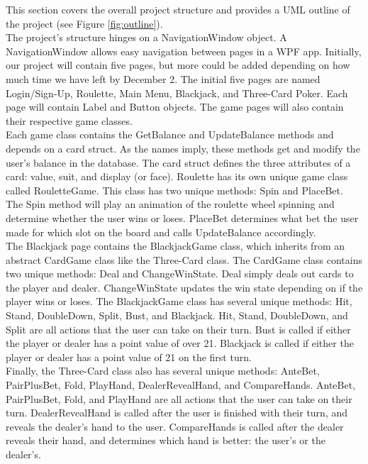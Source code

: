 \documentclass[10pt,conference,onecolumn,compsoc]{IEEEtran}
\begin{document}
\noindent
This section covers the overall project structure and provides a UML outline of the project (see Figure \ref{fig:outline}).\\
\newline
The project's structure hinges on a NavigationWindow object. A NavigationWindow allows easy navigation between pages in a WPF app. Initially, our project will contain five pages, but more could be added depending on how much time we have left by December 2. The initial five pages are named Login/Sign-Up, Roulette, Main Menu, Blackjack, and Three-Card Poker. Each page will contain Label and Button objects. The game pages will also contain their respective game classes.\\
\newline
Each game class contains the GetBalance and UpdateBalance methods and depends on a card struct. As the names imply, these methods get and modify the user's balance in the database. The card struct defines the three attributes of a card: value, suit, and display (or face). Roulette has its own unique game class called RouletteGame. This class has two unique methods: Spin and PlaceBet. The Spin method will play an animation of the roulette wheel spinning and determine whether the user wins or loses. PlaceBet determines what bet the user made for which slot on the board and calls UpdateBalance accordingly.\\
\newline
The Blackjack page contains the BlackjackGame class, which inherits from an abstract CardGame class like the Three-Card class. The CardGame class contains two unique methods: Deal and ChangeWinState. Deal simply deals out cards to the player and dealer. ChangeWinState updates the win state depending on if the player wins or loses. The BlackjackGame class has several unique methods: Hit, Stand, DoubleDown, Split, Bust, and Blackjack. Hit, Stand, DoubleDown, and Split are all actions that the user can take on their turn. Bust is called if either the player or dealer has a point value of over 21. Blackjack is called if either the player or dealer has a point value of 21 on the first turn.\\
\newline
Finally, the Three-Card class also has several unique methods: AnteBet, PairPlusBet, Fold, PlayHand, DealerRevealHand, and CompareHands. AnteBet, PairPlusBet, Fold, and PlayHand are all actions that the user can take on their turn. DealerRevealHand is called after the user is finished with their turn, and reveals the dealer's hand to the user. CompareHands is called after the dealer reveals their hand, and determines which hand is better: the user's or the dealer's.

\end{document}
